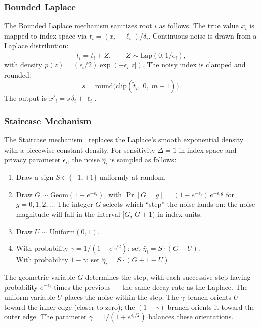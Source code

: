 \subsubsection{\textbf{Bounded Laplace}}
\label{app:blap-alloc}
The Bounded Laplace mechanism sanitizes root $i$ as follows. The true value $x_i$ is mapped to index space via $t_i = (x_i - \ell_i)/\delta_i$. Continuous noise is drawn from a Laplace distribution:
\[
    \tilde{t}_i = t_i + Z, \qquad Z \sim \mathrm{Lap}(0, 1/\epsilon_i),
\]
with density $p(z) = (\epsilon_i / 2)\exp(-\epsilon_i |z|)$. The noisy index is clamped and rounded:
\[
    s = \mathrm{round} \big(\mathrm{clip}(\tilde{t}_i,\; 0,\; m{-}1)\big).
\]
The output is $x'_i = s\,\delta_i + \ell_i$.

\subsubsection{\textbf{Staircase Mechanism}}
\label{app:stair-alloc}

The Staircase mechanism~\cite{geng2015optimal} replaces the Laplace's smooth exponential density with a piecewise-constant density. For sensitivity $\Delta = 1$ in index space and privacy parameter $\epsilon_i$, the noise $\hat{\eta}_i$ is sampled as follows:
\begin{enumerate}
    \item Draw a sign $S \in \{-1, +1\}$ uniformly at random.
    \item Draw $G \sim \mathrm{Geom}(1 - e^{-\epsilon_i})$, with $\Pr[G = g] = (1 - e^{-\epsilon_i})\,e^{-\epsilon_i g}$ for $g = 0, 1, 2, \ldots$\; The integer $G$ selects which ``step'' the noise lands on: the noise magnitude will fall in the interval $[G,\, G{+}1)$ in index units.
    \item Draw $U \sim \mathrm{Uniform}(0, 1)$.
    \item With probability $\gamma = 1/(1 + e^{\epsilon_i/2})$: set $\hat{\eta}_i = S \cdot (G + U)$.\\
          With probability $1 - \gamma$: set $\hat{\eta}_i = S \cdot (G + 1 - U)$.
\end{enumerate}

\noindent The geometric variable $G$ determines the step, with each successive step having probability $e^{-\epsilon_i}$ times the previous --- the same decay rate as the Laplace. The uniform variable $U$ places the noise within the step. The $\gamma$-branch orients $U$ toward the inner edge (closer to zero); the $(1{-}\gamma)$-branch orients it toward the outer edge. The parameter $\gamma = 1/(1 + e^{\epsilon_i/2})$ balances these orientations.


